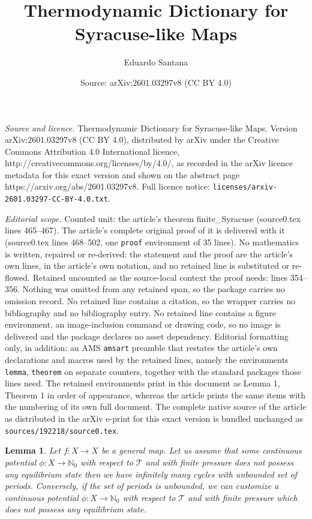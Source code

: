 \documentclass[10pt,a4paper]{amsart}
\title{Thermodynamic Dictionary for Syracuse-like Maps}
\author{Eduardo Santana}
\date{Source: arXiv:2601.03297v8 (CC BY 4.0)}
\newtheorem{lemma}{Lemma}
\begin{document}
\maketitle

\noindent\emph{Source and licence.} Thermodynamic Dictionary for Syracuse-like Maps. Version arXiv:2601.03297v8 (CC BY 4.0), distributed by arXiv under the Creative Commons Attribution 4.0 International licence, http://creativecommons.org/licenses/by/4.0/, as recorded in the arXiv licence metadata for this exact version and shown on the abstract page https://arxiv.org/abs/2601.03297v8. Full licence notice: \texttt{licenses/arxiv-2601.03297-CC-BY-4.0.txt}.\par\smallskip

\noindent\textit{Editorial scope.} Counted unit: the article's theorem finite\_Syracuse (source0.tex lines 465--467). The article's complete original proof of it is delivered with it (source0.tex lines 468--502, one \texttt{proof} environment of 35 lines). No mathematics is written, repaired or re-derived: the statement and the proof are the article's own lines, in the article's own notation, and no retained line is substituted or re-flowed.  Retained uncounted as the source-local context the proof needs: lines 354--356.  Nothing was omitted from any retained span, so the package carries no omission record.  No retained line contains a citation, so the wrapper carries no bibliography and no bibliography entry.  No retained line contains a figure environment, an image-inclusion command or drawing code, so no image is delivered and the package declares no asset dependency.  Editorial formatting only, in addition: an AMS \texttt{amsart} preamble that restates the article's own declarations and macros used by the retained lines, namely the environments \texttt{lemma}, \texttt{theorem} on separate counters, together with the standard packages those lines need.  The retained environments print in this document as Lemma 1, Theorem 1 in order of appearance, whereas the article prints the same items with the numbering of its own full document.  The complete native source of the article as distributed in the arXiv e-print for this exact version is bundled unchanged as \texttt{sources/192218/source0.tex}.
	\begin{lemma}\label{converse}
		Let $f: X \to X$ be a general map. Let us assume that some continuous potential $\phi : X \to \mathbb{N}_{0}$ with respect to $\mathcal{T}$ and with finite pressure does not possess any equilibrium state then we have infinitely many cycles with unbounded set of periods. Conversely, if the set of periods is unbounded, we can customize a continuous potential $\phi : X \to \mathbb{N}_{0}$ with respect to $\mathcal{T}$ and with finite pressure which does not possess any equilibrium state.
	\end{lemma}
\end{document}

